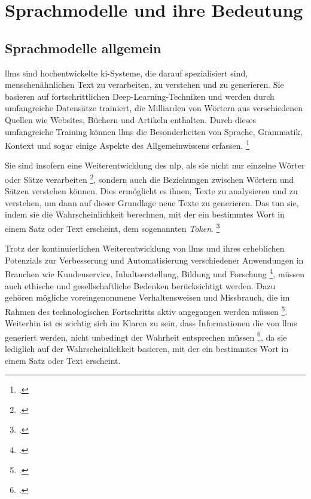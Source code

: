 \section{Sprachmodelle und ihre Bedeutung} \label{sec:sprachmodelle}
\subsection{Sprachmodelle allgemein} \label{sec:sprachmodelle_allgemein}
\acp{llm} sind hochentwickelte \ac{ki}-Systeme, die darauf spezialisiert sind, menschenähnlichen Text zu verarbeiten, zu verstehen und zu generieren.
Sie basieren auf fortschrittlichen Deep-Learning-Techniken und werden durch umfangreiche Datensätze trainiert, die Milliarden von Wörtern aus verschiedenen Quellen wie Websites, Büchern und Artikeln enthalten.
Durch dieses umfangreiche Training können \acp{llm} die Besonderheiten von Sprache, Grammatik, Kontext und sogar einige Aspekte des Allgemeinwissens erfassen. \footcite[Vgl.][S. 93 ff.]{Taulli2023}

Sie sind insofern eine Weiterentwicklung des \ac{nlp}, als sie nicht nur einzelne Wörter oder Sätze verarbeiten \footcite[Vgl.][S. 245 ff.]{NLP_2008}, sondern auch die Beziehungen zwischen Wörtern und Sätzen verstehen können.
Dies ermöglicht es ihnen, Texte zu analysieren und zu verstehen, um dann auf dieser Grundlage neue Texte zu generieren.
Das tun sie, indem sie die Wahrscheinlichkeit berechnen, mit der ein bestimmtes Wort in einem Satz oder Text erscheint, dem sogenannten \textit{Token}. \footcite[Vgl.][]{google:llm}

Trotz der kontinuierlichen Weiterentwicklung von \acp{llm} und ihres erheblichen Potenzials zur Verbesserung und Automatisierung verschiedener Anwendungen in Branchen wie Kundenservice, Inhaltserstellung, Bildung und Forschung \footcite[Vgl.][S. 4 ff.]{tamkin2021understanding}, müssen auch ethische und gesellschaftliche Bedenken berücksichtigt werden. Dazu gehören mögliche voreingenommene Verhaltensweisen und Missbrauch, die im Rahmen des technologischen Fortschritts aktiv angegangen werden müssen \footcite[Vgl.][S. 1]{Tokayev_2023}.
Weiterhin ist es wichtig sich im Klaren zu sein, dass Informationen die von \acp{llm} generiert werden, nicht unbedingt der Wahrheit entsprechen müssen \footcite[Vgl.][S. 217 f.]{10.1145/3531146.3533088}, da sie lediglich auf der Wahrscheinlichkeit basieren, mit der ein bestimmtes Wort in einem Satz oder Text erscheint.

